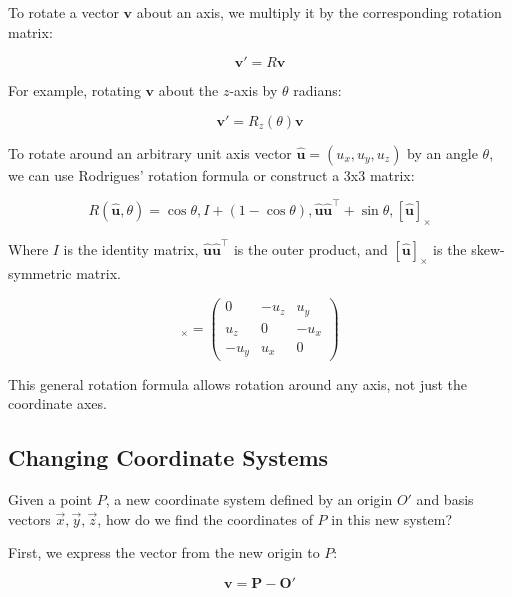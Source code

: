 To rotate a vector $\mathbf{v}$ about an axis, we multiply it by the corresponding rotation matrix:

\begin{equation}
    \mathbf{v}' = R \mathbf{v}
\end{equation}

For example, rotating $\mathbf{v}$ about the $z$-axis by $\theta$ radians:

\begin{equation}
    \mathbf{v}' = R_z(\theta) \mathbf{v}
\end{equation}

To rotate around an arbitrary unit axis vector $\hat{\mathbf{u}} = (u_x, u_y, u_z)$ by an angle $\theta$, we can use Rodrigues' rotation formula or construct a 3x3 matrix:

\begin{equation}
    R(\hat{\mathbf{u}}, \theta) =
    \cos\theta , I +
    (1 - \cos\theta) , \hat{\mathbf{u}} \hat{\mathbf{u}}^\top +
    \sin\theta , [\hat{\mathbf{u}}]_\times
\end{equation}

Where $I$ is the identity matrix, $\hat{\mathbf{u}} \hat{\mathbf{u}}^\top$
is the outer product, and $[\hat{\mathbf{u}}]_\times$ is the skew-symmetric matrix.

\begin{equation}
    [\hat{\mathbf{u}}]_\times =
    \begin{pmatrix}
        0    & -u_z & u_y  \\
        u_z  & 0    & -u_x \\
        -u_y & u_x  & 0
    \end{pmatrix}
\end{equation}

This general rotation formula allows rotation around any axis, not just the coordinate axes.

\subsection{Changing Coordinate Systems}

Given a point $P$, a new coordinate system defined by an origin $O'$ and
basis vectors $\vec{x}, \vec{y}, \vec{z}$, how do we find the coordinates
of $P$ in this new system?

First, we express the vector from the new origin to  $P$:

\begin{equation}
    \mathbf{v} = \mathbf{P} - \mathbf{O'}
\end{equation}


